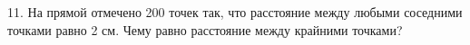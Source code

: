 11. На прямой отмечено 200 точек так, что расстояние между любыми соседними точками равно 2 см. Чему равно расстояние между крайними точками?\\
